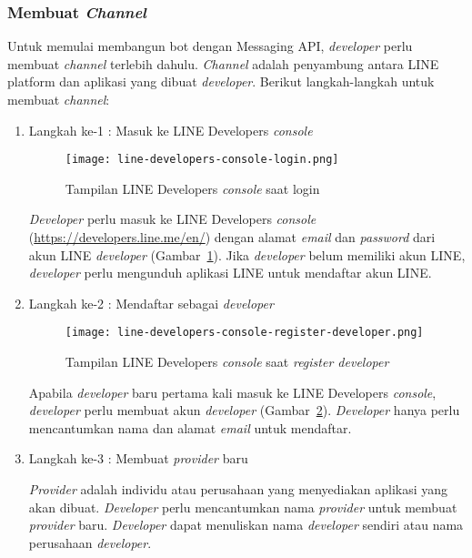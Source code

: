 \subsubsection{Membuat \textit{Channel}}
Untuk memulai membangun bot dengan Messaging API, \textit{developer} perlu membuat \textit{channel} terlebih dahulu. \textit{Channel} adalah penyambung antara LINE platform dan aplikasi yang dibuat \textit{developer}. Berikut langkah-langkah untuk membuat \textit{channel}:
\begin{enumerate}
\item Langkah ke-1 : Masuk ke LINE Developers \textit{console}

\begin{figure}[H]
	\centering  
	\texttt{[image: line-developers-console-login.png]}  
	\caption[Tampilan LINE Developers \textit{console} saat login]{Tampilan LINE Developers \textit{console} saat login} 
	\label{fig:line-developers-console-login} 
\end{figure}

\textit{Developer} perlu masuk ke LINE Developers \textit{console} (\url{https://developers.line.me/en/}) dengan alamat \textit{email} dan \textit{password} dari akun LINE \textit{developer} (Gambar~\ref{fig:line-developers-console-login}). Jika \textit{developer} belum memiliki akun LINE, \textit{developer} perlu mengunduh aplikasi LINE untuk mendaftar akun LINE.

\item Langkah ke-2 : Mendaftar sebagai \textit{developer}

\begin{figure}[H]
	\centering  
	\texttt{[image: line-developers-console-register-developer.png]}  
	\caption[Tampilan LINE Developers \textit{console} saat \textit{register developer}]{Tampilan LINE Developers \textit{console} saat \textit{register developer}} 
	\label{fig:line-developers-console-register-developer} 
\end{figure}

Apabila \textit{developer} baru pertama kali masuk ke LINE Developers \textit{console}, \textit{developer} perlu membuat akun \textit{developer} (Gambar~\ref{fig:line-developers-console-register-developer}). \textit{Developer} hanya perlu mencantumkan nama dan alamat \textit{email} untuk mendaftar.

\item Langkah ke-3 : Membuat \textit{provider} baru

\textit{Provider} adalah individu atau perusahaan yang menyediakan aplikasi yang akan dibuat. \textit{Developer} perlu mencantumkan nama \textit{provider} untuk membuat \textit{provider} baru. \textit{Developer} dapat menuliskan nama \textit{developer} sendiri atau nama perusahaan \textit{developer}.


\end{enumerate}
